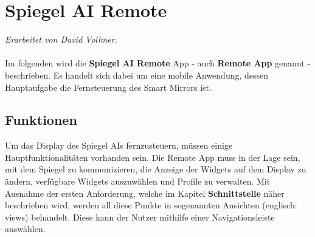 \chapter{Spiegel AI Remote}
\textit{Erarbeitet von David Vollmer.}
\\ \\
Im folgenden wird die \textbf{Spiegel AI Remote} App - auch \textbf{Remote App} genannt - beschrieben. Es handelt sich dabei um eine mobile Anwendung, dessen Hauptaufgabe die Fernsteuerung des Smart Mirrors ist.

\section{Funktionen}
Um das Display des Spiegel AIs fernzusteuern, müssen einige Hauptfunktionalitäten vorhanden sein. Die Remote App muss in der Lage sein, mit dem Spiegel zu kommunizieren, die Anzeige der Widgets auf dem Display zu ändern, verfügbare Widgets auszuwählen und Profile zu verwalten. Mit Ausnahme der ersten Anforderung, welche im Kapitel \textbf{Schnittstelle} näher beschrieben wird, werden all diese Punkte in sogenannten Ansichten (englisch: views) behandelt. Diese kann der Nutzer mithilfe einer Navigationsleiste auswählen.

